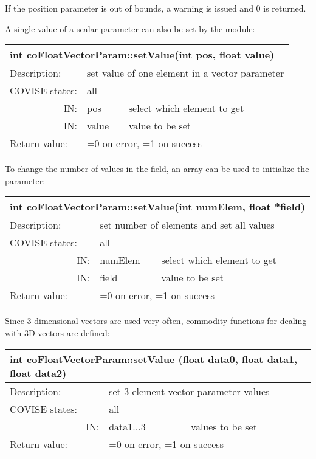 If the position parameter is out of bounds, a warning is issued and 0 is returned.

A single value of a scalar parameter can also be set by the module:

\begin{longtable}{|p{4cm}|p{2.5cm}|p{7cm}|}
\hline
\multicolumn{3}{|p{13.5cm}|}{\bf int coFloatVectorParam::setValue(int pos, float value)} \\
\hline
{Description:}   
               & \multicolumn{2}{|p{9.5cm}|}{set value of one element in a vector parameter} \\
\hline
{COVISE states:} & \multicolumn{2}{|p{9.5cm}|}{all} \\
\hline
\multicolumn{1}{|r|}{IN:} & {pos} 
                             & {select which element to get}\\
\hline
\multicolumn{1}{|r|}{IN:} & {value} 
                             & {value to be set}\\
\hline
{Return value:}  
                        & \multicolumn{2}{|p{9.5cm}|}{=0 on error, =1 on success} \endhead
\hline
\end{longtable}

To change the number of values in the field, an array can be used to initialize 
the parameter:


\begin{longtable}{|p{4cm}|p{2.5cm}|p{7cm}|}
\hline
\multicolumn{3}{|p{13.5cm}|}{\bf int coFloatVectorParam::setValue(int numElem, float *field)} \\
\hline
{Description:}   
               & \multicolumn{2}{|p{9.5cm}|}{set number of elements and set all values} \\
\hline
{COVISE states:} & \multicolumn{2}{|p{9.5cm}|}{all} \\
\hline
\multicolumn{1}{|r|}{IN:} & {numElem} 
                             & {select which element to get}\\
\hline
\multicolumn{1}{|r|}{IN:} & {field} 
                             & {value to be set}\\
\hline
{Return value:}  
                        & \multicolumn{2}{|p{9.5cm}|}{=0 on error, =1 on success} \endhead
\hline
\end{longtable}

Since 3-dimensional vectors are used very often, commodity functions for dealing with 
3D vectors are defined:


\begin{longtable}{|p{4cm}|p{2.5cm}|p{7cm}|}
\hline
\multicolumn{3}{|p{13.5cm}|}{\bf int coFloatVectorParam::setValue (float data0, float data1, float data2)}\\
\hline
{Description:}   
               & \multicolumn{2}{|p{9.5cm}|}{set 3-element vector parameter values} \\
\hline
{COVISE states:} & \multicolumn{2}{|p{9.5cm}|}{all} \\
\hline
\multicolumn{1}{|r|}{IN:} & {data1...3} 
                             & {values to be set}\\
\hline
{Return value:}  
                        & \multicolumn{2}{|p{9.5cm}|}{=0 on error, =1 on success} \endhead
\hline
\end{longtable}

